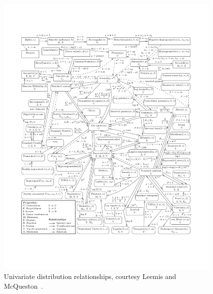 \documentclass[landscape]{article}
\begin{document}
\begin{figure}
  \captionsetup{labelformat=empty,labelsep=none}
  \includegraphics[width=\textwidth]{figs/relationships}
  \caption{Univariate distribution relationships, courtesy Leemis and
  McQueston~\cite{Leemis08}.}
\end{figure}
\end{document}
